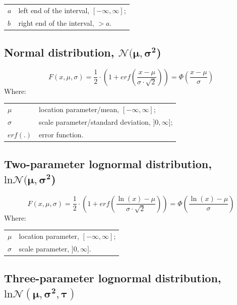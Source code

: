 \begin{tabular}{ll}
	$a$ & left end of the interval, $[-\infty, \infty]$; \\
	$b$ & right end of the interval, $>a$.
\end{tabular}

\subsection*{Normal distribution, $\boldsymbol{\mathcal{N}(\mu,\sigma^2}$)}

\begin{equation}
	F(x,\mu ,\sigma ) = \frac{1}{2} \cdot \left( {1 + erf\left( {\frac{{x - \mu }}{{\sigma  \cdot \sqrt 2 }}} \right)} \right) = \Phi \left( {\frac{{x - \mu }}{\sigma }} \right)
\end{equation}	
Where:

\begin{tabular}{ll}
	$\mu$ & location parameter/mean, $[-\infty, \infty]$; \\
	$\sigma$ & scale parameter/standard deviation, $]0, \infty]$; \\
	$erf(.)$ & error function.
\end{tabular}

\subsection*{Two-parameter lognormal distribution, $\boldsymbol{\mathrm{ln}\mathcal{N}(\mu,\sigma^2}$)}

\begin{equation}
	F(x,\mu ,\sigma ) = \frac{1}{2} \cdot \left( {1 + erf\left( {\frac{{\ln (x) - \mu }}{{\sigma  \cdot \sqrt 2 }}} \right)} \right) = \Phi \left( {\frac{{\ln (x) - \mu }}{\sigma }} \right)
\end{equation}	
Where:

\begin{tabular}{ll}
	$\mu$ & location parameter, $[-\infty, \infty]$; \\
	$\sigma$ & scale parameter, $]0, \infty]$.
\end{tabular}

\subsection*{Three-parameter lognormal distribution, $\boldsymbol{\mathrm{ln}\mathcal{N}(\mu,\sigma^2, \tau)}$}

